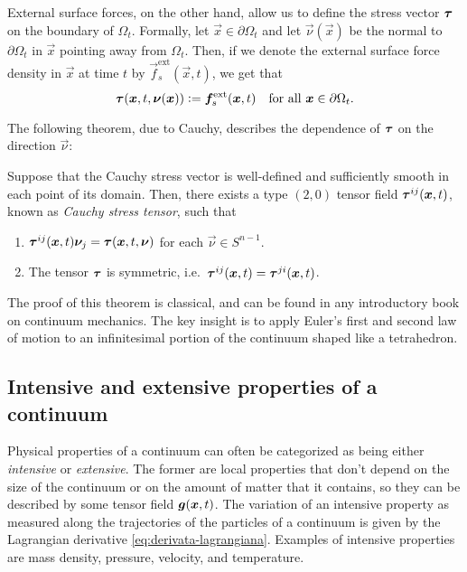 External surface forces, on the other hand, allow us to define
the stress vector $\bm{\tau}$ on the boundary of $\Omega_t$.
Formally, let $\vec{x} \in \partial \Omega_t$ and let $\vec{\nu}(\vec{x})$
be the normal to $\partial \Omega_t$ in $\vec{x}$ pointing away from $\Omega_t$.
Then, if we denote the external surface force density in $\vec{x}$ at
time $t$ by $\vec{f}_s^{\text{ext}}(\vec{x},t)$, we get that
\begin{equation} \label{eq:sforzo-sul-bordo}
\bm{\tau}(\bm{x},t,\bm{\nu}(\bm{x}))
\vcentcolon= \bm{f}_s^{\text{ext}}(\bm{x},t)
\quad \text{for all $\bm{x} \in \partial \Omega_t$}.
\end{equation}

\noindent The following theorem, due to Cauchy, describes the dependence
of $\bm{\tau}$ on the direction $\vec{\nu}$:
\begin{theo}
Suppose that the Cauchy stress vector is well-defined and sufficiently
smooth in each point of its domain. Then, there exists a type $(2,0)$
tensor field $\bm{\tau}^{ij}(\bm{x},t)$,
known as \emph{Cauchy stress tensor}, such that
\begin{enumerate}
\item $\bm{\tau}^{ij}(\bm{x},t) \bm{\nu}_j = \bm{\tau}(\bm{x},t,\bm{\nu})$
	for each $\vec{\nu} \in S^{n-1}$.
\item The tensor $\bm{\tau}$ is symmetric,
	i.e.\ $\bm{\tau}^{ij}(\bm{x},t) = \bm{\tau}^{ji}(\bm{x},t)$.
\end{enumerate}
\end{theo}

\noindent The proof of this theorem is classical, and can be found
in any introductory book on continuum mechanics.
The key insight is to apply Euler's first and second law of motion
to an infinitesimal portion of the continuum shaped like a tetrahedron.

\subsection*{Intensive and extensive properties of a continuum}

Physical properties of a continuum can often be categorized as being
either \emph{intensive} or \emph{extensive}. The former are local
properties that don't depend on the size of the continuum or on
the amount of matter that it contains, so they can be described
by some tensor field $\bm{g}(\bm{x},t)$. The variation of an intensive
property as measured along the trajectories of the particles of a continuum
is given by the Lagrangian derivative \eqref{eq:derivata-lagrangiana}.
Examples of intensive properties are mass density, pressure, velocity,
and temperature.

